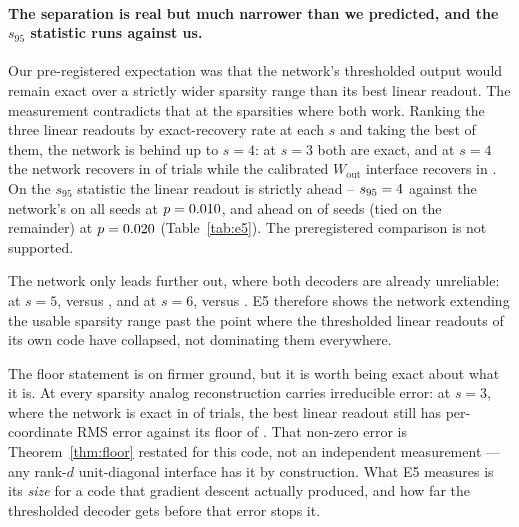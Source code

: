 \paragraph{The separation is real but much narrower than we predicted, and the $s_{95}$
statistic runs against us.} Our pre-registered expectation was that the network's thresholded
output would remain exact over a strictly wider sparsity range than its best linear readout.
The measurement contradicts that at the sparsities where both work. Ranking the three linear
readouts by exact-recovery rate at each $s$ and taking the best of them, the network is behind
up to $s=4$: at $s=3$ both are exact, and at $s=4$ the network recovers in
\EfiveLfourPmodelFour{} of trials while the calibrated $W_{\mathrm{out}}$ interface recovers in
\EfiveLfourPlinFour. On the $s_{95}$ statistic the linear readout is strictly ahead --
$s_{95}=4$ against the network's \EfiveLfourSmodelMax{} on all
\EfiveSeeds{} seeds at $p=0.010$, and ahead on
\EfiveLfourSlinAheadSecondary{} of \EfiveSeeds{} seeds (tied on the remainder) at
$p=0.020$ (Table~\ref{tab:e5}). The preregistered comparison is not supported.

The network only leads further out, where both decoders are already unreliable: at $s=5$,
\EfiveLfourPmodelFive{} versus \EfiveLfourPlinFive, and at $s=6$, \EfiveLfourPmodelSix{} versus
\EfiveLfourPlinSix. E5 therefore shows the network extending the usable sparsity range past the point where the
thresholded linear readouts of its own code have collapsed, not dominating them everywhere.

The floor statement is on firmer ground, but it is worth being exact about what it is. At every
sparsity analog reconstruction carries irreducible error: at $s=3$, where the network is exact in
\EfiveLfourPmodelThree{} of trials, the best linear readout still has per-coordinate RMS error
\EfiveLfourRmsThree{} against its floor of \EfiveLfourFloorThree. That non-zero error is
Theorem~\ref{thm:floor} restated for this code, not an independent measurement --- any
rank-$d$ unit-diagonal interface has it by construction. What E5 measures is its \emph{size} for
a code that gradient descent actually produced, and how far the thresholded decoder gets before
that error stops it.

